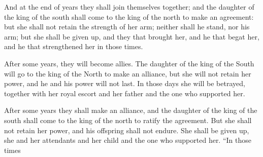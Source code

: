 			\begin{versebox}
					\item[BHS] 
					\item[LXX] 
					\item[ASV] And at the end of years they shall join themselves together; and the daughter of the king of the south shall come to the king of the north to make an agreement: but she shall not retain the strength of her arm; neither shall he stand, nor his arm; but she shall be given up, and they that brought her, and he that begat her, and he that strengthened her in those times.
					\item[NIV] After some years, they will become allies. The daughter of the king of the South will go to the king of the North to make an alliance, but she will not retain her power, and he and his power will not last. In those days she will be betrayed, together with her royal escort and her father and the one who supported her.
					\item[NRSV] After some years they shall make an alliance, and the daughter of the king of the south shall come to the king of the north to ratify the agreement. But she shall not retain her power, and his offspring shall not endure. She shall be given up, she and her attendants and her child and the one who supported her. “In those times
			\end{versebox}

